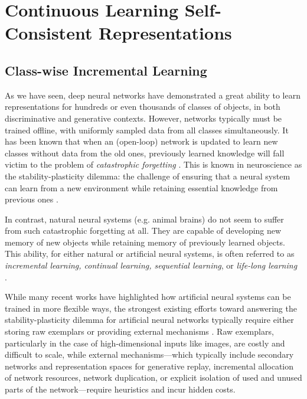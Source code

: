 \documentclass[../../book-main.tex]{subfiles}
\begin{document}
\section{Continuous Learning Self-Consistent Representations}
\label{sec:continuous}

\subsection{Class-wise Incremental Learning}
\label{sec:class-wise-incremental}

As we have seen, deep neural networks have demonstrated a great ability to learn representations for hundreds or even thousands of classes of objects, in both discriminative and generative contexts. However, networks typically must be trained offline, with uniformly sampled data from all classes simultaneously. It has been known that when an (open-loop) network is updated to learn new classes without data from the old ones, previously learned knowledge will fall victim to the problem of {\em catastrophic forgetting} \cite{McCloskey1989catastrophic}. This is known in neuroscience as the stability-plasticity dilemma: the challenge of ensuring that a neural system can learn from a new environment while retaining essential knowledge from previous ones \cite{Grossberg1987CompetitiveLF}.

In contrast, natural neural systems (e.g. animal brains) do not seem to suffer from such catastrophic forgetting at all. They are capable of developing new memory of new objects while retaining memory of previously learned objects. This ability, for either natural or artificial neural systems, is often referred to as {\em  incremental learning, continual learning, sequential learning}, or {\em life-long learning}~ \cite{controlled-forgetting}.



While many recent works have highlighted how artificial neural systems can be  trained in more flexible ways, the strongest existing efforts toward answering the stability-plasticity dilemma for artificial neural networks typically require either storing raw exemplars \cite{icarl,chaudhry2019tiny} or providing external mechanisms \cite{EWC}. Raw exemplars, particularly in the case of high-dimensional inputs like images, are costly and difficult to scale, while external mechanisms---which typically include secondary networks and representation spaces for generative replay, incremental allocation of network resources, network duplication, or explicit isolation of used and unused parts of the network---require heuristics and incur hidden costs.
\end{document}
